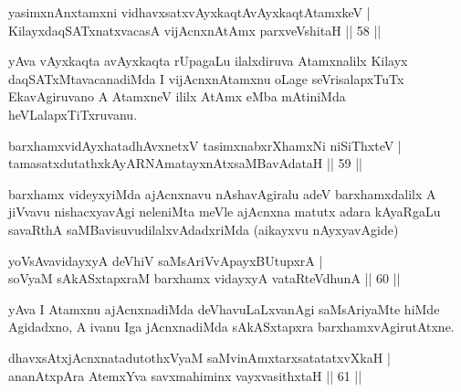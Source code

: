 \begin{shl}\footnotemark[2]yasimxnAnxtamxni vidhavxsatxvAyxkaqtAvAyxkaqtAtamxkeV |\\
KilayxdaqSATxnatxvacasA vijAcnxnAtAmx parxveVshitaH \hfill || 58 ||
\end{shl}

\begin{artha}
 yAva vAyxkaqta avAyxkaqta rUpagaLu ilalxdiruva Atamxnalilx Kilayx daqSATxMtavacanadiMda I vijAcnxnAtamxnu oLage seVrisalapxTuTx EkavAgiruvano A AtamxneV ililx AtAmx eMba mAtiniMda heVLalapxTiTxruvanu.
\end{artha}


\begin{shl}
barxhamxvidAyxhatadhAvxnetxV tasimxnabxrXhamxNi niSiThxteV |\\
tamasatxdutathxkAyARNAmatayxnAtxsaMBavAdataH \hfill || 59 ||
\end{shl}

\begin{artha}
barxhamx videyxyiMda ajAcnxnavu nAshavAgiralu adeV barxhamxdalilx A
jiVvavu nishacxyavAgi neleniMta meVle ajAcnxna matutx adara kAyaRgaLu
savaRthA saMBavisuvudilalxvAdadxriMda (aikayxvu nAyxyavAgide)
\end{artha}


\begin{shl}
yoV\s sAvavidayxyA deVhiV saMsAriVvApayxBUtupxrA |\\
soV\s yaM sAkASxtapxraM barxhamx vidayxyA vataRteV\s dhunA \hfill || 60 ||
\end{shl} 

\begin{artha}
yAva I Atamxnu ajAcnxnadiMda deVhavuLaLxvanAgi saMsAriyaMte hiMde Agidadxno, A ivanu Iga jAcnxnadiMda sAkASxtapxra barxhamxvAgirutAtxne.
\end{artha}


\begin{shl}
dhavxsAtxjAcnxnatadutothxVyaM saMvinAmxtarxsatatatxvXkaH |\\
ananAtxpAra AtemxYva savxmahiminx vayxvasithxtaH \hfill || 61 ||
\end{shl}

